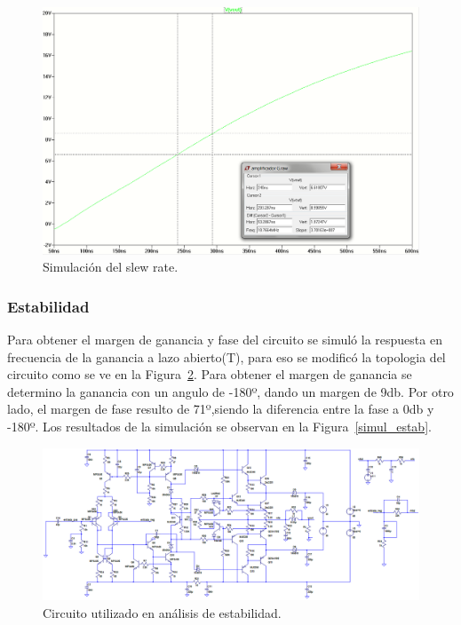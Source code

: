 \begin{figure}[H]
\centering
\centerline{\includegraphics[width=1\textwidth]{img/slew_rate.png}}
\caption{Simulación del slew rate.}
\label{simul_slew_rate}
\end{figure}

\medskip
\subsubsection{Estabilidad}

Para obtener el margen de ganancia y fase del circuito se simuló la respuesta en frecuencia de la ganancia a lazo abierto(T), para eso se modificó la topologia del circuito como se ve en la Figura~\ref{cir_simul_estab}. Para obtener el margen de ganancia se determino la ganancia con un angulo de -180º, dando un margen de 9db. Por otro lado, el margen de fase resulto de 71º,siendo la diferencia entre la fase a 0db y -180º.
Los resultados de la simulación se observan en la Figura~\ref{simul_estab}.

\begin{figure}[H]
\centering
\includegraphics[width=1\textwidth]{img/margen_fase_ganancia_cir.png}
\caption{Circuito utilizado en análisis de estabilidad.}
\label{cir_simul_estab}
\end{figure}


